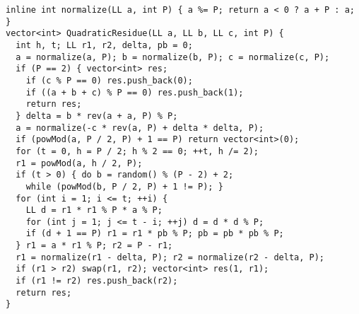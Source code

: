 \begin{lstlisting}
inline int normalize(LL a, int P) { a %= P; return a < 0 ? a + P : a; }
vector<int> QuadraticResidue(LL a, LL b, LL c, int P) {
  int h, t; LL r1, r2, delta, pb = 0;
  a = normalize(a, P); b = normalize(b, P); c = normalize(c, P);
  if (P == 2) { vector<int> res;
    if (c % P == 0) res.push_back(0);
    if ((a + b + c) % P == 0) res.push_back(1);
    return res;
  } delta = b * rev(a + a, P) % P;
  a = normalize(-c * rev(a, P) + delta * delta, P);
  if (powMod(a, P / 2, P) + 1 == P) return vector<int>(0);
  for (t = 0, h = P / 2; h % 2 == 0; ++t, h /= 2);
  r1 = powMod(a, h / 2, P);
  if (t > 0) { do b = random() % (P - 2) + 2;
    while (powMod(b, P / 2, P) + 1 != P); }
  for (int i = 1; i <= t; ++i) {
    LL d = r1 * r1 % P * a % P;
    for (int j = 1; j <= t - i; ++j) d = d * d % P;
    if (d + 1 == P) r1 = r1 * pb % P; pb = pb * pb % P;
  } r1 = a * r1 % P; r2 = P - r1;
  r1 = normalize(r1 - delta, P); r2 = normalize(r2 - delta, P);
  if (r1 > r2) swap(r1, r2); vector<int> res(1, r1);
  if (r1 != r2) res.push_back(r2);
  return res;
}
\end{lstlisting}
